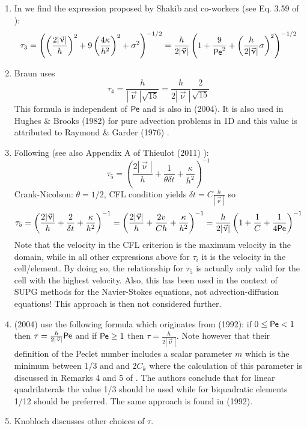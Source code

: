 \begin{enumerate}
\item In \textcite{dohu03} we find the expression proposed by Shakib and co-workers (see Eq. 3.59 of \cite{shhj91}):
\[
\tau_3=\left( \left(\frac{2|\vec\upnu|}{h} \right)^2 
+9 \left(\frac{4\kappa}{h^2} \right)^2 + \sigma^2  \right)^{-1/2}
= \frac{h}{2|\vec\upnu|} \left(  1 + \frac{9}{{\mathsf{Pe}}^2} 
+ \left(\frac{h}{2|\vec\upnu|} \sigma  \right)^2 \right)^{-1/2}
\]

\item
Braun \cite{brau03} uses 
\[
\tau_4 = \frac{h}{|\vec\upnu| \sqrt{15}} = \frac{h}{2|\vec\upnu|} \frac{2}{\sqrt{15}} 
\]
This formula is independent of ${\mathsf{Pe}}$ and is also in \textcite{bogs04} (2004).
It is also used in Hughes \& Brooks (1982) \cite{hubr82} for pure advection problems in 1D
and this value is attributed to Raymond \& Garder (1976)  \cite{raga76}.

\item Following \textcite{teos00} (see also Appendix A of Thieulot (2011) \cite{thie11}):
\[
\tau_5 = \left( \frac{2 |\vec{\upnu}|}{h} + \frac{1}{\theta \delta t} + \frac{\kappa}{h^2} \right)^{-1}  
\]
Crank-Nicolson: $\theta=1/2$, CFL condition yields $\delta t = C \frac{h}{|\vec\upnu|}$ so 
\[
\tau_5 = \left( \frac{2 |\vec{\upnu}|}{h} + \frac{2}{\delta t}+  \frac{\kappa}{h^2}  \right)^{-1}  
= \left( \frac{2 |\vec{\upnu}|}{h} + \frac{2 v}{C h} +  \frac{\kappa}{h^2}  \right)^{-1}  
= \frac{h}{2 |\vec{\upnu}|}  \left( 1 + \frac{1}{C} + \frac{1}{4 {\mathsf{Pe}}} \right)^{-1} \nonumber 
\]
Note that the velocity in the CFL criterion is the maximum velocity in the domain, while 
in all other expressions above for $\tau_i$ it is the velocity in the cell/element. 
By doing so, the relationship  for $\tau_5$ is actually only valid for the cell with the 
highest velocity. 
Also, this has been used in the context of SUPG methods for the Navier-Stokes equations, 
not advection-diffusion equations! This approach is then not considered further.

\item \textcite{frhm04} (2004) use the following formula which originates from 
\textcite{frfh92} (1992): if $0\le {\mathsf{Pe}} < 1$ then
$\tau = \frac{h}{2 |\vec\upnu|} {\mathsf{Pe}}$ and if ${\mathsf{Pe}} \ge 1$ then $\tau = \frac{h}{2 |\vec\upnu|}$.
Note however that their definition of the Peclet number includes a scalar parameter $m$ which is 
the minimum between 1/3 and and 2$C_k$ where the calculation of this parameter is discussed in 
Remarks 4 and 5 of \cite{frfh92}. The authors conclude that for linear quadrilaterals the value
1/3 should be used while for biquadratic elements 1/12 should be preferred.
The same approach is found in \textcite{brbf92} (1992). 

\item Knobloch \cite{knob08} discusses other choices of $\tau$.


\end{enumerate}

